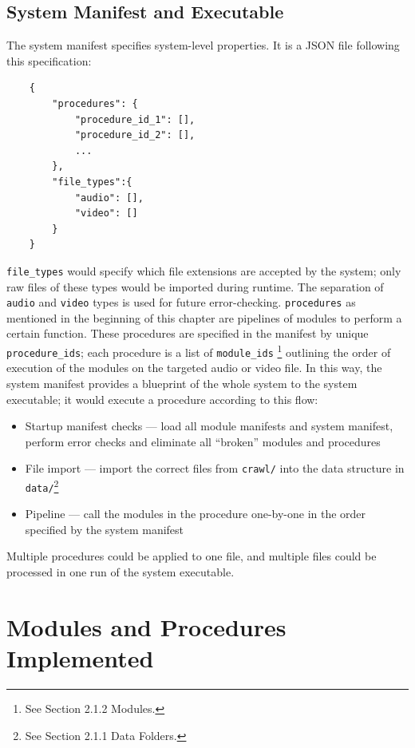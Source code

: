 \subsection{System Manifest and Executable}

The system manifest specifies system-level properties. It is a JSON file following
this specification:

\begin{lstlisting}
    {
        "procedures": {
            "procedure_id_1": [],
            "procedure_id_2": [],
            ...
        },
        "file_types":{
            "audio": [],
            "video": []
        }
    }
\end{lstlisting}

\texttt{file\_types} would specify which file extensions are accepted by the system;
only raw files of these types would be imported during runtime. The separation of
\texttt{audio} and \texttt{video} types is used for future error-checking.
\texttt{procedures} as mentioned in the beginning of this chapter are pipelines of
modules to perform a certain function. These procedures are specified in the manifest
by unique \texttt{procedure\_ids}; each procedure is a list of \texttt{module\_ids}
\footnote{See Section 2.1.2 Modules.} outlining the order of execution of the modules
on the targeted audio or video file. In this way, the system manifest provides a
blueprint of the whole system to the system executable; it would execute a procedure
according to this flow:

\begin{itemize}
    \item Startup manifest checks --- load all module manifests and system manifest,
    perform error checks and eliminate all ``broken'' modules and procedures
    \item File import --- import the correct files from \texttt{crawl/} into the data
    structure in \texttt{data/}\footnote{See Section 2.1.1 Data Folders.}
    \item Pipeline --- call the modules in the procedure one-by-one in the order
    specified by the system manifest
\end{itemize}

Multiple procedures could be applied to one file, and multiple files could be
processed in one run of the system executable.

\section{Modules and Procedures Implemented}

